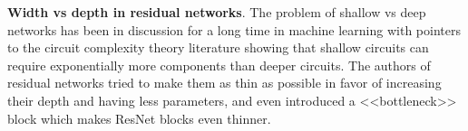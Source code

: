 \documentclass{bmvc2k}
\begin{document}
\textbf{Width vs depth in residual networks}.
The problem of shallow vs deep networks has been in discussion for a long time in machine learning \cite{LarochelleH2007,Bengio+chapter2007} with pointers to the circuit complexity theory literature showing that shallow circuits can require exponentially more components than deeper circuits. The authors of residual networks tried to make them as thin as possible in favor of increasing their depth and having less parameters, and even introduced a <<bottleneck>> block which makes ResNet blocks even thinner.
\begin{figure}
  \centering

\end{figure}
\end{document}
